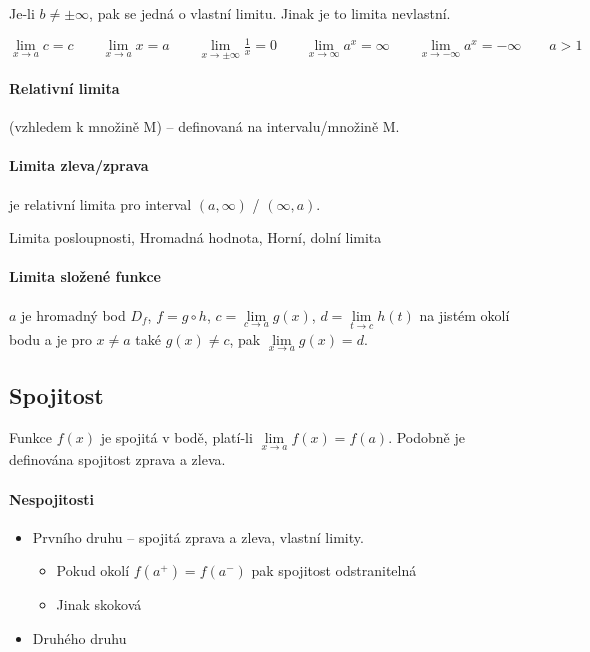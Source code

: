 \documentclass[a4paper, 11pt]{report}
\begin{document}
Je-li $b \neq \pm \infty$, pak se jedná o vlastní limitu. Jinak je to limita nevlastní.

$\lim\limits_{x \to a} c = c \qquad
\lim\limits_{x \to a} x = a \qquad
\lim\limits_{x \to \pm \infty} \frac{1}{x} = 0 \qquad
\lim\limits_{x \to \infty} a^x = \infty \qquad
\lim\limits_{x \to - \infty} a^x = - \infty \qquad a > 1$

\paragraph{Relativní limita} (vzhledem k množině M) -- definovaná na intervalu/množině M.

\paragraph{Limita zleva/zprava} je relativní limita pro interval $(a,\infty)$ / $(\infty, a)$.

Limita posloupnosti, Hromadná hodnota, Horní, dolní limita

\paragraph{Limita složené funkce} $a$ je hromadný bod $D_f$, $f = g \circ h$, $c = \lim\limits_{c \to a} g(x)$, $d = \lim\limits_{t \to c} h(t)$ na jistém okolí bodu a je pro $x \neq a$ také $g(x) \neq c$, pak $\lim\limits_{x \to a} g(x) = d$.

\subsection{Spojitost}
Funkce $f(x)$ je spojitá v bodě, platí-li $\lim\limits_{x \to a} f(x) = f(a)$. Podobně je definována spojitost zprava a zleva.

\paragraph{Nespojitosti}
\begin{itemize}
	\item Prvního druhu -- spojitá zprava a zleva, vlastní limity.
	\begin{itemize}
		\item Pokud okolí $f(a^+) = f(a^-)$ pak spojitost odstranitelná
		\item Jinak skoková
	\end{itemize}
	\item Druhého druhu
\end{itemize}
\end{document}
